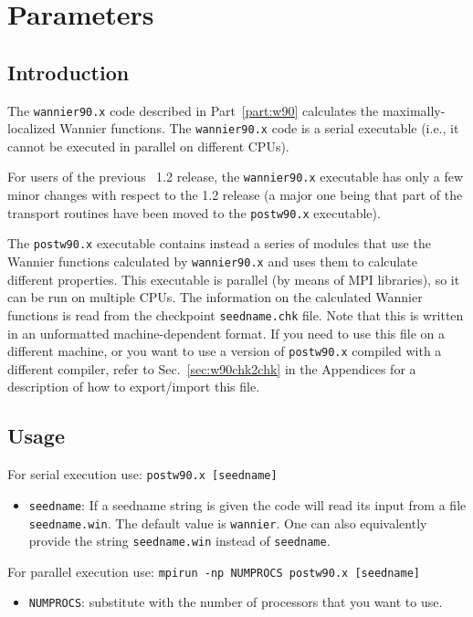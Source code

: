 \chapter{Parameters}

\section{Introduction}
The \texttt{wannier90.x} code described in Part~\ref{part:w90}
calculates the maximally-localized Wannier functions. The \texttt{wannier90.x} code is a
serial executable (i.e., it cannot be executed in parallel on different
CPUs).

For users of the previous \wannier\ 1.2 release, the
\texttt{wannier90.x} executable has only a few minor changes with
respect to the 1.2 release (a major one being that part of the
transport routines have been moved to the \texttt{postw90.x}
executable).

The \texttt{postw90.x} executable contains instead a series of modules
that use the Wannier functions calculated by \texttt{wannier90.x} and
uses them to calculate different properties. 
This executable is parallel (by means of MPI libraries), so it can be run on multiple CPUs.
The information on the
calculated Wannier functions is read from the checkpoint 
\verb|seedname.chk| file. Note that this is written in an unformatted
machine-dependent format. If you need to use this file on a different
machine, or you want to use a version of \texttt{postw90.x} compiled
with a different compiler, refer to Sec.~\ref{sec:w90chk2chk} in the Appendices for a description
of how to export/import this file.

\section{Usage}
For serial execution use: {\tt postw90.x [seedname]} 

\begin{itemize} \item 
{\tt seedname}: If a seedname string is given the code
will read its input from a file {\tt seedname.win}. The default
  value is {\tt wannier}. One can also equivalently provide the string
  {\tt seedname.win} instead of  {\tt seedname}.
\end{itemize}

For parallel execution use: {\tt mpirun -np NUMPROCS postw90.x [seedname]}

\begin{itemize} \item 
{\tt NUMPROCS}: substitute with the number of processors that you want
to use.
\end{itemize}

